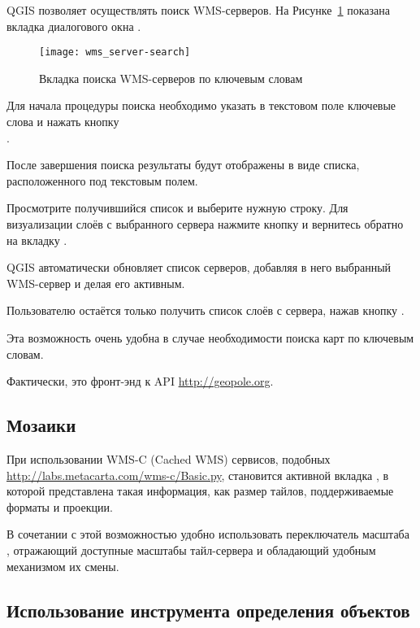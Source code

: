 QGIS позволяет осуществлять поиск WMS-серверов. На Рисунке~\ref{fig:searchtab}
показана вкладка  диалогового окна
.

\begin{figure}[ht]
  \centering
  \texttt{[image: wms\_server-search]}
    \caption{Вкладка поиска WMS-серверов по ключевым словам
    \wincaption}\label{fig:searchtab}
\end{figure}

Для начала процедуры поиска необходимо указать в текстовом поле ключевые
слова и нажать кнопку \\ .

После завершения поиска результаты будут отображены в виде списка,
расположенного под текстовым полем.

Просмотрите получившийся список и выберите нужную строку. Для визуализации
слоёв с выбранного сервера нажмите кнопку  и вернитесь обратно на вкладку .

QGIS автоматически обновляет список серверов, добавляя в него выбранный
WMS-сервер и делая его активным.

Пользователю остаётся только получить список слоёв с сервера, нажав кнопку
.

Эта возможность очень удобна в случае необходимости поиска карт по
ключевым словам.

Фактически, это фронт-энд к API \url{http://geopole.org}.

%
%
\subsection{Мозаики}\label{sec:tilesets}

При использовании WMS-C (Cached WMS) сервисов, подобных
\url{http://labs.metacarta.com/wms-c/Basic.py}, становится активной вкладка
, в которой представлена такая информация, как размер
тайлов, поддерживаемые форматы и проекции.

В сочетании с этой возможностью удобно использовать переключатель масштаба
 \arrow \\
, отражающий доступные масштабы
тайл-сервера и обладающий удобным механизмом их смены.
%
%
\subsection{Использование инструмента определения
объектов}\label{sec:ogc-wms-identify}

